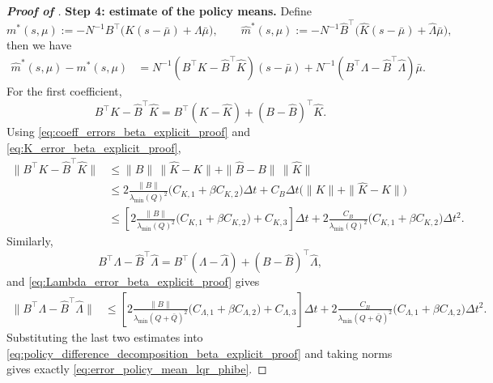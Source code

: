 \documentclass[a4paper, 10pt, english, reqno]{amsart}
\begin{document}
\begin{proof}[\textbf{Proof of }]
\medskip
\noindent
\textbf{Step 4: estimate of the policy means.}
Define
\begin{equation}
\label{eq:def_policy_mean_exact_lqr_phibe}
    m^*(s,\mu)
    :=
    -N^{-1}B^\top
    \bigl(K(s-\bar\mu)+\Lambda\bar\mu\bigr),
    \qquad
    \hat m^*(s,\mu)
    :=
    -N^{-1}\hat B^\top
    \bigl(\hat K(s-\bar\mu)+\hat\Lambda\bar\mu\bigr),
\end{equation}
then we have
\begin{align}
\label{eq:policy_difference_decomposition_beta_explicit_proof}
  \hat m^*(s,\mu)-m^*(s,\mu)
  &=
  N^{-1}(B^\top K-\hat B^\top\hat K)(s-\bar\mu)
  +
  N^{-1}(B^\top\Lambda-\hat B^\top\hat\Lambda)\bar\mu .
\end{align}
For the first coefficient,
\[
  B^\top K-\hat B^\top\hat K
  =
  B^\top(K-\hat K)+(B-\hat B)^\top\hat K.
\]
Using \eqref{eq:coeff_errors_beta_explicit_proof} and \eqref{eq:K_error_beta_explicit_proof},
\begin{align*}
  \|B^\top K-\hat B^\top\hat K\|
  &\le
  \|B\|\,\|\hat K-K\|
  +
  \|\hat B-B\|\,\|\hat K\| \\
  &\le
  2\frac{\|B\|}{\lambda_{\min}(Q)^2}
  \bigl(C_{K,1}+\beta C_{K,2}\bigr)\Delta t
  +
  C_B\Delta t
  \bigl(\|K\|+\|\hat K-K\|\bigr) \\
  &\le
  \left[
    2\frac{\|B\|}{\lambda_{\min}(Q)^2}
    \bigl(C_{K,1}+\beta C_{K,2}\bigr)
    +
    C_{K,3}
  \right]\Delta t
  +
  2\frac{C_B}{\lambda_{\min}(Q)^2}
  \bigl(C_{K,1}+\beta C_{K,2}\bigr)\Delta t^2.
\end{align*}
Similarly,
\[
  B^\top\Lambda-\hat B^\top\hat\Lambda
  =
  B^\top(\Lambda-\hat\Lambda)+(B-\hat B)^\top\hat\Lambda,
\]
and \eqref{eq:Lambda_error_beta_explicit_proof} gives
\begin{align*}
  \|B^\top\Lambda-\hat B^\top\hat\Lambda\|
  &\le
  \left[
    2\frac{\|B\|}{\lambda_{\min}(Q+\bar Q)^2}
    \bigl(C_{\Lambda,1}+\beta C_{\Lambda,2}\bigr)
    +
    C_{\Lambda,3}
  \right]\Delta t
  +
  2\frac{C_B}{\lambda_{\min}(Q+\bar Q)^2}
  \bigl(C_{\Lambda,1}+\beta C_{\Lambda,2}\bigr)\Delta t^2.
\end{align*}
Substituting the last two estimates into \eqref{eq:policy_difference_decomposition_beta_explicit_proof} and taking norms gives exactly \eqref{eq:error_policy_mean_lqr_phibe}.

\medskip
\noindent


\end{proof}
\end{document}
